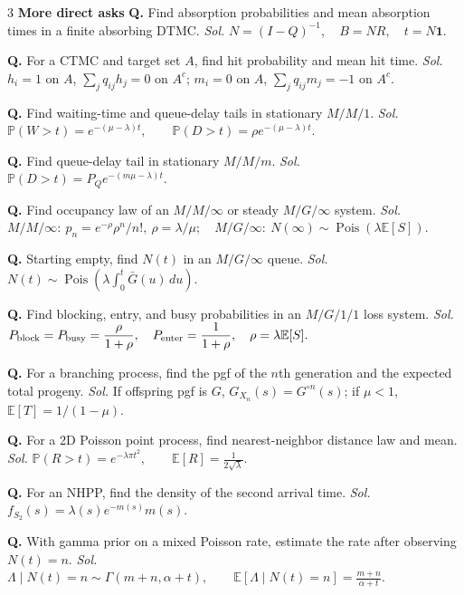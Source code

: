 \documentclass[a4paper,8pt,fleqn]{extarticle}
\newcommand{\E}{\mathbb{E}}
\newcommand{\PP}{\mathbb{P}}
\newcommand{\1}{\mathbf{1}}
\newcommand{\sub}[1]{\textbf{#1} }
\newcommand{\probq}[2]{\textbf{Q.} #1 \emph{Sol.} #2\par}
\DeclareMathOperator{\Pois}{Pois}
\begin{document}
\begin{multicols}{3}
\sub{More direct asks}
\probq{Find absorption probabilities and mean absorption times in a finite absorbing DTMC.}{\(\displaystyle N=(I-Q)^{-1},\quad B=NR,\quad t=N\mathbf1.\)}
\probq{For a CTMC and target set \(A\), find hit probability and mean hit time.}{\(\displaystyle h_i=1\) on \(A\), \(\sum_j q_{ij}h_j=0\) on \(A^c\); \(\displaystyle m_i=0\) on \(A\), \(\sum_j q_{ij}m_j=-1\) on \(A^c\).}
\probq{Find waiting-time and queue-delay tails in stationary \(M/M/1\).}{\(\displaystyle \PP(W>t)=e^{-(\mu-\lambda)t},\qquad \PP(D>t)=\rho e^{-(\mu-\lambda)t}.\)}
\probq{Find queue-delay tail in stationary \(M/M/m\).}{\(\displaystyle \PP(D>t)=P_Q e^{-(m\mu-\lambda)t}.\)}
\probq{Find occupancy law of an \(M/M/\infty\) or steady \(M/G/\infty\) system.}{\(\displaystyle M/M/\infty:\ p_n=e^{-\rho}\rho^n/n!,\ \rho=\lambda/\mu;\quad M/G/\infty:\ N(\infty)\sim\Pois(\lambda\E[S]).\)}
\probq{Starting empty, find \(N(t)\) in an \(M/G/\infty\) queue.}{\(\displaystyle N(t)\sim\Pois\!\left(\lambda\int_0^t \bar G(u)\,du\right).\)}
\probq{Find blocking, entry, and busy probabilities in an \(M/G/1/1\) loss system.}{\(\displaystyle P_{\rm block}=P_{\rm busy}=\frac{\rho}{1+\rho},\quad P_{\rm enter}=\frac{1}{1+\rho},\quad \rho=\lambda\E[S].\)}
\probq{For a branching process, find the pgf of the \(n\)th generation and the expected total progeny.}{If offspring pgf is \(G\), \(G_{X_n}(s)=G^{\circ n}(s)\); if \(\mu<1\), \(\E[T]=1/(1-\mu)\).}
\probq{For a 2D Poisson point process, find nearest-neighbor distance law and mean.}{\(\displaystyle \PP(R>t)=e^{-\lambda\pi t^2},\qquad \E[R]=\frac{1}{2\sqrt{\lambda}}.\)}
\probq{For an NHPP, find the density of the second arrival time.}{\(\displaystyle f_{S_2}(s)=\lambda(s)e^{-m(s)}m(s).\)}
\probq{With gamma prior on a mixed Poisson rate, estimate the rate after observing \(N(t)=n\).}{\(\displaystyle \Lambda\mid N(t)=n\sim\Gamma(m+n,\alpha+t),\qquad \E[\Lambda\mid N(t)=n]=\frac{m+n}{\alpha+t}.\)}


\end{multicols}
\end{document}

